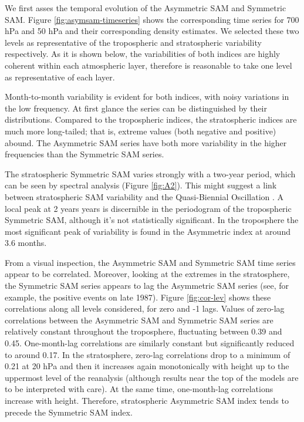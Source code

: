 \documentclass[smallextended]{svjour3}       %
\begin{document}
We first asses the temporal evolution of the Asymmetric SAM and Symmetric SAM. Figure \ref{fig:asymsam-timeseries} shows the corresponding time series for 700 hPa and 50 hPa and their corresponding density estimates. We selected these two levels as representative of the tropospheric and stratospheric variability respectively. As it is shown below, the variabilities of both indices are highly coherent within each atmospheric layer, therefore is reasonable to take one level as representative of each layer.

Month-to-month variability is evident for both indices, with noisy variations in the low frequency. At first glance the series can be distinguished by their distributions. Compared to the tropospheric indices, the stratospheric indices are much more long-tailed; that is, extreme values (both negative and positive) abound. The Asymmetric SAM series have both more variability in the higher frequencies than the Symmetric SAM series.

The stratospheric Symmetric SAM varies strongly with a two-year period, which can be seen by spectral analysis (Figure \ref{fig:A2}). This might suggest a link between stratospheric SAM variability and the Quasi-Biennial Oscillation \citep{baldwin2001b}. A local peak at 2 years years is discernible in the periodogram of the tropospheric Symmetric SAM, although it's not statistically significant. In the troposphere the most significant peak of variability is found in the Asymmetric index at around 3.6 months.

From a visual inspection, the Asymmetric SAM and Symmetric SAM time series appear to be correlated. Moreover, looking at the extremes in the stratosphere, the Symmetric SAM series appears to lag the Asymmetric SAM series (see, for example, the positive events on late 1987). Figure \ref{fig:cor-lev} shows these correlations along all levels considered, for zero and -1 lags. Values of zero-lag correlations between the Asymmetric SAM and Symmetric SAM series are relatively constant throughout the troposphere, fluctuating between 0.39 and 0.45. One-month-lag correlations are similarly constant but significantly reduced to around 0.17. In the stratosphere, zero-lag correlations drop to a minimum of 0.21 at 20 hPa and then it increases again monotonically with height up to the uppermost level of the reanalysis (although results near the top of the models are to be interpreted with care). At the same time, one-month-lag correlations increase with height. Therefore, stratospheric Asymmetric SAM index tends to precede the Symmetric SAM index.
\end{document}
